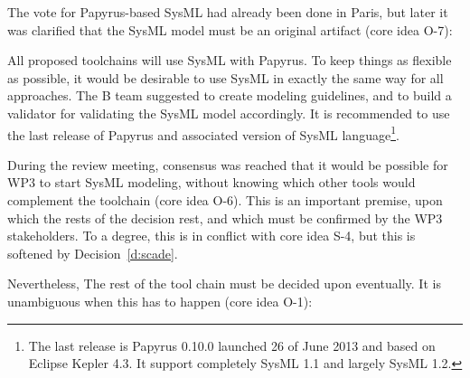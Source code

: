 The vote for Papyrus-based SysML had already been done in Paris, but later it was clarified that the SysML model must be an original artifact (core idea O-7):


All proposed toolchains will use SysML with Papyrus.  To keep things as flexible as possible, it would be desirable to use SysML in exactly the same way for all approaches.  The B team suggested to create modeling guidelines, and to build a validator for validating the SysML model accordingly. It is recommended to use the last release of Papyrus and associated version of SysML  language\footnote{The last release is Papyrus 0.10.0 launched 26 of June 2013 and based on Eclipse Kepler 4.3. It support completely SysML 1.1 and largely SysML 1.2.}.


During the review meeting, consensus was reached that it would be possible for WP3 to start SysML modeling, without knowing which other tools would complement the toolchain (core idea O-6).  This is an important premise, upon which the rests of the decision rest, and which must be confirmed by the WP3 stakeholders. To a degree, this is in conflict with core idea S-4, but this is softened by Decision~\ref{d:scade}.


Nevertheless, The rest of the tool chain must be decided upon eventually.  It is unambiguous when this has to happen (core idea O-1):


